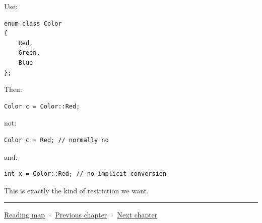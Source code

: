 \hypertarget{05-engine-i-ch002-scoped-enums}{}

Use:

\begin{verbatim}
enum class Color
{
    Red,
    Green,
    Blue
};
\end{verbatim}

Then:

\begin{verbatim}
Color c = Color::Red;
\end{verbatim}

not:

\begin{verbatim}
Color c = Red; // normally no
\end{verbatim}

and:

\begin{verbatim}
int x = Color::Red; // no implicit conversion
\end{verbatim}

This is exactly the kind of restriction we want.

\begin{center}\rule{0.5\linewidth}{0.5pt}\end{center}

\hyperref[volume-reading-map]{Reading map} · \hyperref[05-engine-i-ch001-a-game-promise-becomes-bytes-and-running-state]{Previous chapter} · \hyperref[05-engine-i-ch003-object-representation-lifetime-and-enforceable-promises]{Next chapter}
